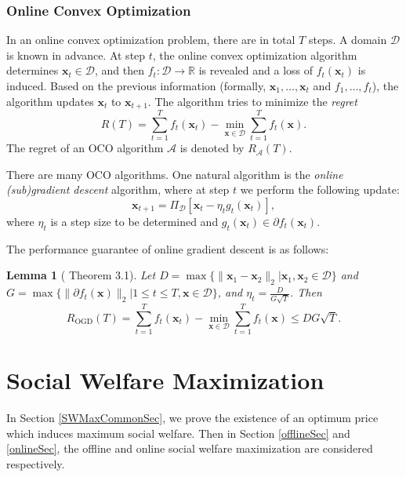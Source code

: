 \documentclass{article}
\newtheorem{lemma}{Lemma}[section]
\begin{document}
\subsubsection{Online Convex Optimization}
In an online convex optimization problem, there are in total $T$ steps. A domain $\mathcal{D}$ is known in advance. At step $t$, the online convex optimization algorithm determines $\mathbf{x}_t\in \mathcal{D}$, and then $f_t:\mathcal{D}\to \mathbb{R}$ is revealed and a loss of $f_t(\mathbf{x}_t)$ is induced. Based on the previous information (formally, $\mathbf{x}_1,\ldots,\mathbf{x}_t$ and $f_1,\ldots,f_t$), the algorithm updates $\mathbf{x}_t$ to $\mathbf{x}_{t+1}$. The algorithm tries to minimize the \emph{regret}
\begin{equation}
    R(T)=\sum_{t=1}^{T}f_t(\mathbf{x}_t)-\min_{\mathbf{x}\in \mathcal{D}}\sum_{t=1}^{T}f_t(\mathbf{x}).
\end{equation}
The regret of an OCO algorithm $\mathcal{A}$ is denoted by $R_{\mathcal{A}}(T)$.

There are many OCO algorithms. One natural algorithm is the \emph{online (sub)gradient descent} algorithm, where at step $t$ we perform the following update:
\begin{equation}
    \mathbf{x}_{t+1}=\Pi_{\mathcal{D}}[\mathbf{x}_t-\eta_tg_t(\mathbf{x}_t)],
\end{equation}
where $\eta_t$ is a step size to be determined and $g_t(\mathbf{x}_t)\in\partial f_t(\mathbf{x}_t)$.

The performance guarantee of online gradient descent is as follows:
\begin{lemma}[\cite{H16} Theorem 3.1]
    Let $D=\max\{\|\mathbf{x}_1-\mathbf{x}_2\|_2|\mathbf{x}_1,\mathbf{x}_2\in \mathcal{D}\}$ and $G=\max\{\|\partial f_t(\mathbf{x})\|_2|1\le t\le T,\mathbf{x}\in \mathcal{D}\}$, and $\eta_t=\frac{D}{G\sqrt{T}}$. Then
    \begin{equation}
        R_{\mathrm{OGD}}(T)=\sum_{t=1}^{T}f_t(\mathbf{x}_t)-\min_{\mathbf{x}\in \mathcal{D}}\sum_{t=1}^{T}f_t(\mathbf{x})\le DG\sqrt{T}.
    \end{equation}
\end{lemma}

\section{Social Welfare Maximization}
In Section \ref{SWMaxCommonSec}, we prove the existence of an optimum price which induces maximum social welfare. Then in Section \ref{offlineSec} and \ref{onlineSec}, the offline and online social welfare maximization are considered respectively.
\end{document}
